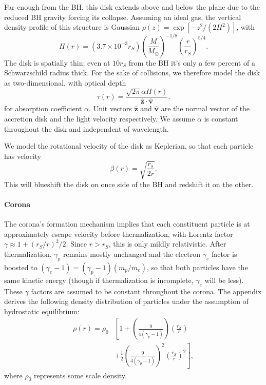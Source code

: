 \documentclass[twocolumn,twocolappendix]{aastex631}
\newcommand{\parens}[1]{\left(#1\right)}
\begin{document}
Far enough from the BH, this disk extends above and below the plane due to the reduced BH gravity forcing its collapse. Assuming an ideal gas, the vertical density profile of this structure is Gaussian $\rho(z) = \exp[-z^2/(2H^2)]$, with
\begin{equation}
  H(r) = (3.7 \times 10^{-3} r_S) \parens{\frac{M}{M_\odot}}^{-1/8}\parens{\frac{r}{r_S}}^{5/4}.
\end{equation}
The disk is spatially thin; even at $10 r_S$ from the BH it's only a few percent of a Schwarzschild radius thick. For the sake of collisions, we therefore model the disk as two-dimensional, with optical depth
\begin{equation}
  \tau(r) = \frac{\sqrt{2\pi}\alpha H(r)}{\hat{\mathbf z} \cdot \hat{\mathbf v}}.
\end{equation}
for absorption coefficient $\alpha$. Unit vectors $\hat{\mathbf z}$ and $\hat{\mathbf v}$ are the normal vector of the accretion disk and the light velocity respectively. We assume $\alpha$ is constant throughout the disk and independent of wavelength.

We model the rotational velocity of the disk as Keplerian, so that each particle has velocity
\begin{equation}
  \beta(r) = \sqrt{\frac{r_s}{2r}}.
\end{equation}
This will blueshift the disk on once side of the BH and redshift it on the other.

\paragraph{Corona} The corona's formation mechanism implies that each constituent particle is at approximately escape velocity before thermalization, with Lorentz factor $\gamma \approx 1 + (r_S/r)^2/2$. Since $r > r_S$, this is only mildly relativistic. After thermalization, $\gamma_p$ remains mostly unchanged and the electron $\gamma_e$ factor is boosted to $(\gamma_e -1) = (\gamma_p - 1) (m_p / m_e)$, so that both particles have the same kinetic energy (though if thermalization is incomplete, $\gamma_e$ will be less). These $\gamma$ factors are assumed to be constant throughout the corona. The appendix derives the following density distribution of particles under the assumption of hydrostatic equilibrium:
\begin{equation}
  \begin{split}
  \rho(r) = \rho_0 &\left[1 + \parens{\frac{9}{4(\gamma_p-1)}}\parens{\frac{r_S}{r}}\right.\\
  &+ \left. \frac{1}{2}\parens{\frac{9}{4(\gamma_p-1)}}^2\parens{\frac{r_S}{r}}^2\right],
  \end{split}
\end{equation}
where $\rho_0$ represents some scale density.
\end{document}
